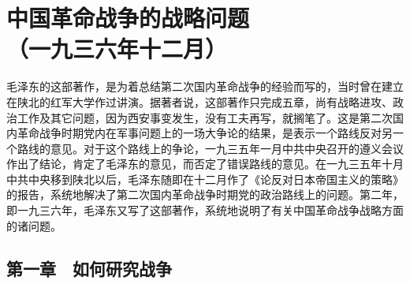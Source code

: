 \documentclass[cn,11pt,chinese]{elegantbook}
\def\myformat#1{\hfil\hfil #1}
\begin{document}
\newpage\section*{\myformat{中国革命战争的战略问题}\\\myformat{（一九三六年十二月）}}
\begin{introduction}\item  毛泽东的这部著作，是为着总结第二次国内革命战争的经验而写的，当时曾在建立在陕北的红军大学作过讲演。据著者说，这部著作只完成五章，尚有战略进攻、政治工作及其它问题，因为西安事变发生，没有工夫再写，就搁笔了。这是第二次国内革命战争时期党内在军事问题上的一场大争论的结果，是表示一个路线反对另一个路线的意见。对于这个路线上的争论，一九三五年一月中共中央召开的遵义会议作出了结论，肯定了毛泽东的意见，而否定了错误路线的意见。在一九三五年十月中共中央移到陕北以后，毛泽东随即在十二月作了《论反对日本帝国主义的策略》的报告，系统地解决了第二次国内革命战争时期党的政治路线上的问题。第二年，即一九三六年，毛泽东又写了这部著作，系统地说明了有关中国革命战争战略方面的诸问题。\end{introduction}
\subsection*{\myformat{第一章　如何研究战争}}
\end{document}
